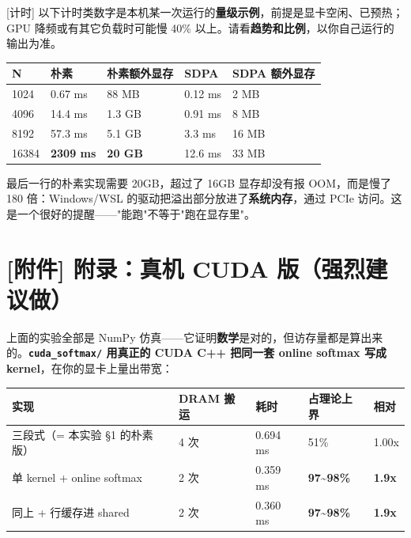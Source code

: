 \begin{noteBox}[核心导读与背景]
{}[计时] 以下计时类数字是本机某一次运行的\textbf{量级示例}，前提是显卡空闲、已预热；GPU 降频或有其它负载时可能慢 40\% 以上。请看\textbf{趋势和比例}，以你自己运行的输出为准。
\end{noteBox}

\begin{center}
\small
\begin{tabularx}{\textwidth}{l X X X X }
\toprule
\textbf{N} & \textbf{朴素} & \textbf{朴素额外显存} & \textbf{SDPA} & \textbf{SDPA 额外显存} \\
\midrule
1024 & 0.67 ms & 88 MB & 0.12 ms & 2 MB \\
4096 & 14.4 ms & 1.3 GB & 0.91 ms & 8 MB \\
8192 & 57.3 ms & 5.1 GB & 3.3 ms & 16 MB \\
16384 & \textbf{2309 ms} & \textbf{20 GB} & 12.6 ms & 33 MB \\
\bottomrule
\end{tabularx}
\end{center}

最后一行的朴素实现需要 20GB，超过了 16GB 显存却没有报 OOM，而是慢了 180 倍：Windows/WSL 的驱动把溢出部分放进了\textbf{系统内存}，通过 PCIe 访问。这是一个很好的提醒——"能跑"不等于"跑在显存里"。

\section{[附件] 附录：真机 CUDA 版（强烈建议做）}

上面的实验全部是 NumPy 仿真——它证明\textbf{数学}是对的，但访存量都是算出来的。\textbf{\textbf{\texttt{cuda\_softmax/}} 用真正的 CUDA C++ 把同一套 online softmax 写成 kernel}，在你的显卡上量出带宽：

\begin{center}
\small
\begin{tabularx}{\textwidth}{l X X X X }
\toprule
\textbf{实现} & \textbf{DRAM 搬运} & \textbf{耗时} & \textbf{占理论上界} & \textbf{相对} \\
\midrule
三段式（= 本实验 §1 的朴素版） & 4 次 & 0.694 ms & 51\% & 1.00x \\
单 kernel + online softmax & 2 次 & 0.359 ms & \textbf{97\textasciitilde{}98\%} & \textbf{1.9x} \\
同上 + 行缓存进 shared & 2 次 & 0.360 ms & \textbf{97\textasciitilde{}98\%} & \textbf{1.9x} \\
\bottomrule
\end{tabularx}
\end{center}

